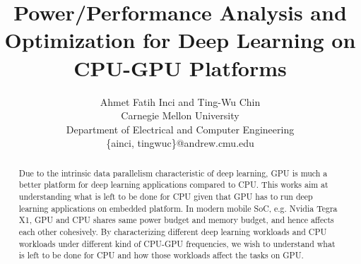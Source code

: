 \documentclass[times, 10pt,twocolumn]{article}
\begin{document}
\title{Power/Performance Analysis and Optimization for Deep Learning on CPU-GPU Platforms}

\author{Ahmet Fatih Inci and Ting-Wu Chin  \\
Carnegie Mellon University\\ Department of Electrical and Computer Engineering \\ \{ainci, tingwuc\}@andrew.cmu.edu\\
}
\maketitle
\thispagestyle{empty}

\begin{abstract}
    Due to the intrinsic data parallelism characteristic of deep learning, GPU is much a better platform for deep learning applications compared to CPU. This works aim at understanding what is left to be done for CPU given that GPU has to run deep learning applications on embedded platform. In modern mobile SoC, e.g. Nvidia Tegra X1, GPU and CPU shares same power budget and memory budget, and hence affects each other cohesively. By characterizing different deep learning workloads and CPU workloads under different kind of CPU-GPU frequencies, we wish to understand what is left to be done for CPU and how those workloads affect the tasks on GPU. 

\end{abstract}









\end{document}
